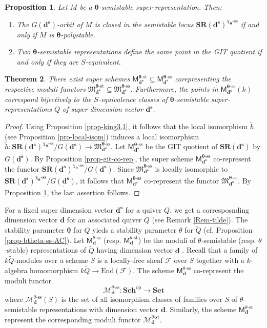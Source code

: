 \documentclass[12pt, reqno]{amsart}
\theoremstyle{plain}
\newtheorem{theorem}{Theorem}[section]
\newtheorem{proposition}[theorem]{Proposition}
\numberwithin{equation}{section}
\def \d{\mathbf{d}}
\def \sd{\mathbf{d^s}}
\def \ra{\rightarrow}
\def \btheta{\boldsymbol{\theta}}
\newcommand{\sheaf}[1]{\mathcal{#1}}
\newcommand{\smfss}{\mathfrak{M}_{\sd}^{\btheta\text{-}\mathrm{ss}}}
\newcommand{\smfs}{\mathfrak{M}_{\sd}^{\btheta\text{-}\mathrm{st}}}
\newcommand{\smss}{\mathsf{M}_{\sd}^{\btheta\text{-}\mathrm{ss}}}
\newcommand{\sms}{\mathsf{M}_{\sd}^{\btheta\text{-}\mathrm{st}}}
\newcommand{\Sch}{\mathbf{Sch}}
\newcommand{\Set}{\mathbf{Set}}
\newcommand{\Ms}{\mathcal{M}}
\newcommand{\fp}[1]{\underline{#1}}%
\begin{document}
\begin{proposition}\cite[cf. Proposition 3.2]{Ki94}\label{prop-git-S-equiv}
Let $M$ be a $\btheta$-semistable super-representation. Then:
\begin{enumerate}
\item[(i)] The $G(\mathbf{\sd})$-orbit of $M$ is closed in the semistable locus $\mathbf{SR}(\sd)^{\chi_{\btheta}\text{-ss}}$ if and only if $M$ is $\btheta$-polystable.
\item[(ii)] Two $\btheta$-semistable representations define the same point in the GIT quotient if and only if they are $S$-equivalent.
\end{enumerate}
\end{proposition}

\begin{theorem}
There exist super schemes $\sms \subseteq \smss$ corepresenting the respective moduli functors $\smfs \subseteq \smfss$. Furthermore,
the points in $\smss(k)$ correspond bijectively to the $S$-equivalence classes of $\btheta$-semistable super-representations $Q$ of super dimension vector $\sd$.
\end{theorem}
\begin{proof}
Using Proposition \ref{prop-king3.1}, it follows that the local isomorphism $\tilde{h}$ (see Proposition \ref{pro-local-isom}) induces a local isomorphism $\tilde{h}\colon \fp{\mathbf{SR}(\sd)^{\chi_{\btheta}\text{-ss}}}/\fp{G(\sd)} \ra \smfss$.
Let $\smss$ be the GIT quotient of 
$\mathbf{SR}(\sd)$ by $G(\sd)$. By Proposition \ref{prop-git-co-rep}, the super scheme $\smss$ co-represent the functor 
$\fp{\mathbf{SR}(\sd)^{\chi_{\btheta}\text{-ss}}}/\fp{G(\sd)}$. Since $\smfss$ is locally isomorphic to 
$\fp{\mathbf{SR}(\sd)^{\chi_{\btheta}\text{-ss}}}/\fp{G(\sd)}$, it follows that $\smss$ co-represent the functor
$\smfss$. By Proposition \ref{prop-git-S-equiv}, the last assertion follows.
\end{proof}

For a fixed super dimension vector $\sd$ for a quiver $Q$, 
we get a corresposnding dimension vector $\d$ for an associated quiver $\tilde{Q}$ (see Remark \ref{Rem-tilde}). The stability parameter $\btheta$ for $Q$ yieds a stability parameter $\theta$ for $\tilde{Q}$ (cf. Proposition \ref{prop-btheta-ss-AC}).
Let $\mathsf{M}^{{\theta}\text{-ss}}_\d$ (resp. $\mathsf{M}^{{\theta}\text{-st}}_\d$) be the moduli of 
$\theta$-semistable (resp. $\theta$-stable) representations of $\tilde{Q}$ having dimension vector $\d$ \cite{Ki94}. 
Recall that a family of $k\tilde{Q}$-modules over a scheme $S$ is a locally-free sheaf $\sheaf{F}$
over $S$ together with a $k$-algebra homomorphism $k\tilde{Q}\ra \mathrm{End}(\sheaf{F})$. The scheme $\mathsf{M}^{{\theta}\text{-ss}}_\d$ co-represent the moduli functor
$$
\Ms^{\theta\text{-}\mathrm{ss}}_\d \colon \Sch^\text{op}\ra \Set
$$
where $\Ms^{\theta\text{-}\mathrm{ss}}_\d(S)$ is the set of all isomorphism classes of families over $S$
of $\theta$-semistable representations with dimension vector $\d$. Similarly, the scheme $\mathsf{M}^{{\theta}\text{-st}}_\d$ represent the corresponding moduli functor $\Ms^{\theta\text{-}\mathrm{st}}_\d$.
\end{document}
